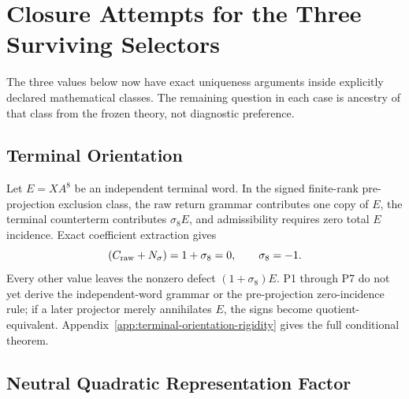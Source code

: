\section{Closure Attempts for the Three Surviving Selectors}
\label{app:three-selector-closure}

The three values below now have exact uniqueness arguments inside explicitly
declared mathematical classes.  The remaining question in each case is
ancestry of that class from the frozen theory, not diagnostic preference.

\subsection{Terminal Orientation}

Let $E=XA^8$ be an independent terminal word.  In the signed finite-rank pre-projection exclusion class, the raw return grammar contributes one copy of $E$, the terminal counterterm contributes $\sigma_8E$, and admissibility requires zero total $E$ incidence.  Exact coefficient extraction gives
\begin{equation}
 [E](C_{\rm raw}+N_{\sigma})=1+\sigma_8=0,
 \qquad \sigma_8=-1.
\end{equation}
Every other value leaves the nonzero defect $(1+\sigma_8)E$.  P1 through P7 do not
yet derive the independent-word grammar or the pre-projection zero-incidence rule; if a later projector merely annihilates $E$, the signs become quotient-equivalent.  Appendix~\ref{app:terminal-orientation-rigidity} gives the full conditional theorem.

\subsection{Neutral Quadratic Representation Factor}

